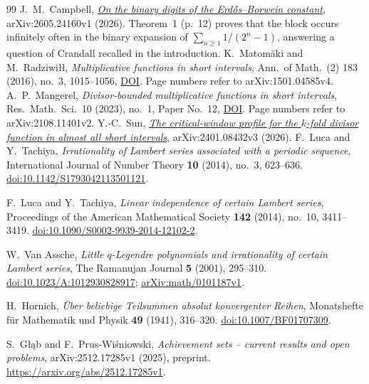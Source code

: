 \documentclass[11pt]{article}
\theoremstyle{plain}
\theoremstyle{definition}
\theoremstyle{remark}
\let\origtexttt\texttt
\renewcommand{\texttt}[1]{\origtexttt{\seqsplit{#1}}}%
\begin{document}
\begin{thebibliography}{99}
 J.~M.~Campbell,
  \href{https://arxiv.org/abs/2605.24160v1}{\emph{On the binary digits of the
  Erd\H{o}s--Borwein constant}}, arXiv:2605.24160v1 (2026).  Theorem~1 (p.~12)
  proves that the block \texttt{11} occurs infinitely often in the binary
  expansion of $\sum_{n\ge1}1/(2^n-1)$, answering a question of Crandall
  recalled in the introduction.
 K.~Matom\"aki and M.~Radziwi\l\l,
  \emph{Multiplicative functions in short intervals}, Ann.\ of Math.\ (2) 183
  (2016), no.~3, 1015--1056,
  \href{https://doi.org/10.4007/annals.2016.183.3.6}{DOI}.  Page numbers
  refer to arXiv:1501.04585v4.
 A.~P.~Mangerel, \emph{Divisor-bounded multiplicative
  functions in short intervals}, Res.\ Math.\ Sci.\ 10 (2023), no.~1, Paper
  No.~12, \href{https://doi.org/10.1007/s40687-023-00376-0}{DOI}.  Page numbers
  refer to arXiv:2108.11401v2.
 Y.-C.~Sun,
  \href{https://arxiv.org/abs/2401.08432v3}{\emph{The critical-window profile
  for the $k$-fold divisor function in almost all short intervals}},
  arXiv:2401.08432v3 (2026).
F.~Luca and Y.~Tachiya,
\emph{Irrationality of Lambert series associated with a periodic sequence},
International Journal of Number Theory \textbf{10} (2014), no.~3, 623--636.
\href{https://doi.org/10.1142/S1793042113501121}{doi:10.1142/S1793042113501121}.

F.~Luca and Y.~Tachiya,
\emph{Linear independence of certain Lambert series},
Proceedings of the American Mathematical Society \textbf{142} (2014), no.~10, 3411--3419.
\href{https://doi.org/10.1090/S0002-9939-2014-12102-2}{doi:10.1090/S0002-9939-2014-12102-2}.

W.~Van Assche,
\emph{Little $q$-Legendre polynomials and irrationality of certain Lambert series},
The Ramanujan Journal \textbf{5} (2001), 295--310.
\href{https://doi.org/10.1023/A:1012930828917}{doi:10.1023/A:1012930828917};
\href{https://arxiv.org/abs/math/0101187v1}{arXiv:math/0101187v1}.

H.~Hornich,
\emph{\"Uber beliebige Teilsummen absolut konvergenter Reihen},
Monatshefte f\"ur Mathematik und Physik \textbf{49} (1941), 316--320.
\href{https://doi.org/10.1007/BF01707309}{doi:10.1007/BF01707309}.

S.~G\l\k{a}b and F.~Prus-Wi\'sniowski,
\emph{Achievement sets -- current results and open problems},
arXiv:2512.17285v1 (2025), preprint.
\url{https://arxiv.org/abs/2512.17285v1}.


\end{thebibliography}
\end{document}
